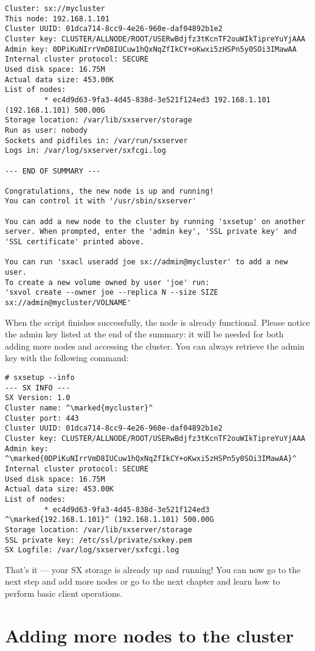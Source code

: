 \begin{lstlisting}
Cluster: sx://mycluster
This node: 192.168.1.101
Cluster UUID: 01dca714-8cc9-4e26-960e-daf04892b1e2
Cluster key: CLUSTER/ALLNODE/ROOT/USERwBdjfz3tKcnTF2ouWIkTipreYuYjAAA
Admin key: 0DPiKuNIrrVmD8IUCuw1hQxNqZfIkCY+oKwxi5zHSPn5y0SOi3IMawAA
Internal cluster protocol: SECURE
Used disk space: 16.75M
Actual data size: 453.00K
List of nodes:
         * ec4d9d63-9fa3-4d45-838d-3e521f124ed3 192.168.1.101 (192.168.1.101) 500.00G
Storage location: /var/lib/sxserver/storage
Run as user: nobody
Sockets and pidfiles in: /var/run/sxserver
Logs in: /var/log/sxserver/sxfcgi.log

--- END OF SUMMARY ---

Congratulations, the new node is up and running!
You can control it with '/usr/sbin/sxserver'

You can add a new node to the cluster by running 'sxsetup' on another
server. When prompted, enter the 'admin key', 'SSL private key' and
'SSL certificate' printed above.

You can run 'sxacl useradd joe sx://admin@mycluster' to add a new user.
To create a new volume owned by user 'joe' run:
'sxvol create --owner joe --replica N --size SIZE sx://admin@mycluster/VOLNAME'
\end{lstlisting}
When the script finishes successfully, the node is already functional.
Please notice the admin key listed at the end of the summary: it will be
needed for both adding more nodes and accessing the cluster. You can
always retrieve the admin key with the following command:
\begin{lstlisting}
# sxsetup --info
--- SX INFO ---
SX Version: 1.0
Cluster name: ^\marked{mycluster}^
Cluster port: 443
Cluster UUID: 01dca714-8cc9-4e26-960e-daf04892b1e2
Cluster key: CLUSTER/ALLNODE/ROOT/USERwBdjfz3tKcnTF2ouWIkTipreYuYjAAA
Admin key: ^\marked{0DPiKuNIrrVmD8IUCuw1hQxNqZfIkCY+oKwxi5zHSPn5y0SOi3IMawAA}^
Internal cluster protocol: SECURE
Used disk space: 16.75M
Actual data size: 453.00K
List of nodes:
         * ec4d9d63-9fa3-4d45-838d-3e521f124ed3 ^\marked{192.168.1.101}^ (192.168.1.101) 500.00G
Storage location: /var/lib/sxserver/storage
SSL private key: /etc/ssl/private/sxkey.pem
SX Logfile: /var/log/sxserver/sxfcgi.log
\end{lstlisting}
That's it --- your SX storage is already up and running! You can now
go to the next step and add more nodes or go to the next chapter and
learn how to perform basic client operations.

\section{Adding more nodes to the cluster} \label{sec:addnode}


